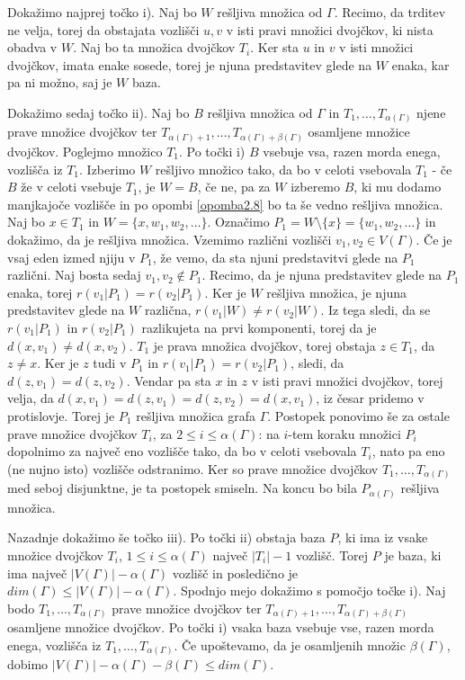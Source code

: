 \documentclass[mat1, tisk]{fmfdelo}
\begin{document}
\begin{dokaz}
  Dokažimo najprej točko i). Naj bo $W$ rešljiva množica od $\Gamma$. Recimo, da trditev ne velja, 
  torej da obstajata vozlišči $u,v$ v isti pravi množici dvojčkov, ki nista obadva v $W$. 
  Naj bo ta množica dvojčkov $T_i$. Ker sta $u$ in $v$ v isti množici dvojčkov, 
  imata enake sosede, torej je njuna predstavitev glede na $W$ enaka, kar pa ni 
  možno, saj je $W$ baza.

  Dokažimo sedaj točko ii). Naj bo $B$ rešljiva množica od $\Gamma$ in 
  $T_1, \ldots, T_{\alpha(\Gamma)}$ njene prave množice dvojčkov ter 
  $T_{\alpha(\Gamma)+1}, \ldots, T_{\alpha(\Gamma)+\beta(\Gamma)}$ osamljene množice dvojčkov.
  Poglejmo množico $T_1$. 
  Po točki i) $B$ vsebuje vsa, razen morda enega, vozlišča iz $T_1$. Izberimo $W$ 
  rešljivo množico tako, da bo v celoti vsebovala $T_1$ - če $B$ že v celoti vsebuje 
  $T_1$, je $W = B$, če ne, pa za $W$ izberemo $B$, ki mu dodamo manjkajoče vozlišče in po 
  opombi \ref{opomba2.8} bo ta še vedno rešljiva množica. Naj bo $x \in T_1$ in 
  $W = \{x, w_1, w_2, \ldots\}$. Označimo $P_1 = W \setminus \{x\} = \{w_1, w_2, \ldots\}$ 
  in dokažimo, da je rešljiva množica.
  Vzemimo različni vozlišči $v_1, v_2 \in V(\Gamma)$. Če je vsaj eden izmed njiju v $P_1$, 
  že vemo, da sta njuni predstavitvi glede na $P_1$ različni. Naj bosta sedaj 
  $v_1, v_2 \notin P_1$. Recimo, da je njuna predstavitev 
  glede na $P_1$ enaka, torej $r(v_1|P_1) = r(v_2|P_1)$. Ker je $W$ rešljiva množica, 
  je njuna predstavitev glede na $W$ različna, $r(v_1|W) \neq r(v_2|W)$. Iz 
  tega sledi, da se $r(v_1|P_1)$ in $r(v_2|P_1)$ razlikujeta na prvi komponenti, 
  torej da je $d(x,v_1) \neq d(x,v_2)$. $T_1$ je prava množica dvojčkov, 
  torej obstaja $z \in T_1 $, da $z \neq x$. Ker je $z$ tudi v $P_1$ in 
  $r(v_1|P_1) = r(v_2|P_1)$, sledi, da $d(z,v_1) = d(z,v_2)$. Vendar pa sta 
  $x$ in $z$ v isti pravi množici dvojčkov, torej velja, da 
  $d(x,v_1) = d(z,v_1) = d(z,v_2) = d(x,v_1)$, iz česar pridemo v protislovje. 
  Torej je $P_1$ rešljiva množica grafa $\Gamma$. Postopek ponovimo še za 
  ostale prave množice dvojčkov $T_i$, za $2 \leq i \leq \alpha(\Gamma)$: 
  na $i$-tem koraku množici $P_i$ dopolnimo za največ eno vozlišče tako, da bo 
  v celoti vsebovala $T_i$, nato pa eno (ne nujno isto) vozlišče odstranimo. 
  Ker so prave množice dvojčkov $T_1, \ldots, T_{\alpha(\Gamma)}$ med seboj disjunktne, 
  je ta postopek smiseln.
  Na koncu bo bila $P_{\alpha(\Gamma)}$ rešljiva množica.

  Nazadnje dokažimo še točko iii). Po točki ii) obstaja baza $P$, ki ima iz vsake 
  množice dvojčkov $T_i$, $1 \leq i \leq \alpha(\Gamma)$ največ $|T_i| - 1$ vozlišč. 
  Torej $P$ je baza, ki ima največ $|V(\Gamma)| - \alpha(\Gamma)$ vozlišč in 
  posledično je $dim(\Gamma) \leq |V(\Gamma)| - \alpha(\Gamma)$. Spodnjo mejo dokažimo s 
  pomočjo točke i). Naj bodo $T_1, \ldots, T_{\alpha(\Gamma)}$ prave množice dvojčkov ter 
  $T_{\alpha(\Gamma)+1}, \ldots, T_{\alpha(\Gamma)+\beta(\Gamma)}$ osamljene množice dvojčkov. 
  Po točki i) vsaka baza vsebuje vse, razen morda enega, vozlišča iz 
  $T_1, \ldots, T_{\alpha(\Gamma)}$. Če upoštevamo, da je osamljenih množic $\beta(\Gamma)$, 
  dobimo $|V(\Gamma)| - \alpha(\Gamma) - \beta(\Gamma) \leq dim(\Gamma)$.
\end{dokaz}
\end{document}
